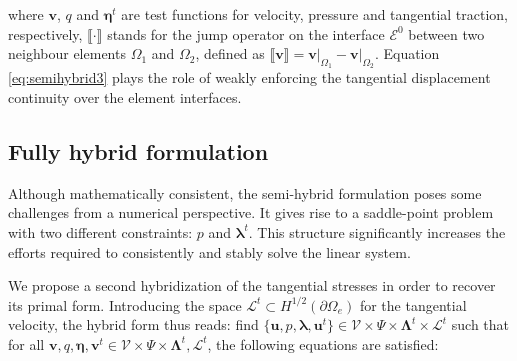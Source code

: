 \documentclass{wccm2024}
\begin{document}
\noindent where $\mathbf{v}$, $q$ and $\boldsymbol{\eta}^t$ are test functions for velocity, pressure and tangential traction, respectively, $\llbracket \cdot \rrbracket$ stands for the jump operator on the interface $\mathcal{E}^0$ between two neighbour elements $\Omega_1$ and $\Omega_2$, defined as $\llbracket \mathbf{v} \rrbracket = \mathbf{v} \vert_{\Omega_1} - \mathbf{v} \vert_{\Omega_2}$. Equation \eqref{eq:semihybrid3} plays the role of weakly enforcing the tangential displacement continuity over the element interfaces.

\subsection{Fully hybrid formulation}

Although mathematically consistent, the semi-hybrid formulation poses some challenges from a numerical perspective. It gives rise to a saddle-point problem with two different constraints: $p$ and $\boldsymbol{\lambda}^t$. This structure significantly increases the efforts required to consistently and stably solve the linear system.

We propose a second hybridization of the tangential stresses in order to recover its primal form. Introducing the space $\mathcal{L}^t \subset H^{1/2}(\partial\Omega_e)$ for the tangential velocity, the hybrid form thus reads: find $\{\mathbf{u},p,\boldsymbol{\lambda},\mathbf{u}^t\} \in \mathcal{V} \times \Psi \times \boldsymbol{\Lambda}^t \times \mathcal{L}^t$ such that for all $\mathbf{v},q,\boldsymbol{\eta},\mathbf{v}^t \in \mathcal{V} \times \Psi \times \boldsymbol{\Lambda}^t,\mathcal{L}^t$, the following equations are satisfied:
\end{document}
